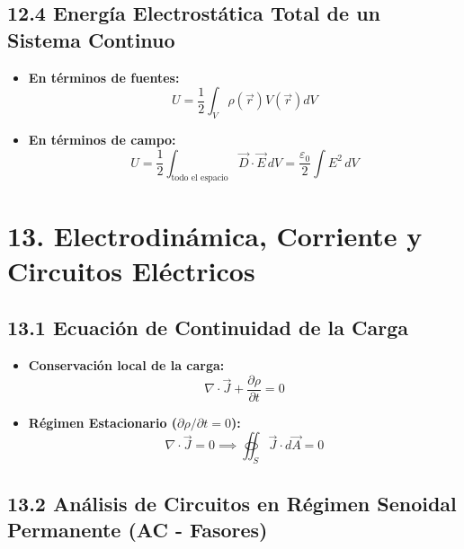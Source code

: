 \documentclass[11pt,a4paper]{article}
\begin{document}
\subsection*{12.4 Energía Electrostática Total de un Sistema Continuo}

\begin{itemize}
  \item \textbf{En términos de fuentes:}
  \[
    U = \frac{1}{2} \int_V \rho(\vec{r}) V(\vec{r}) dV
  \]
  \item \textbf{En términos de campo:}
  \[
    U = \frac{1}{2} \int_{\text{todo el espacio}} \vec{D} \cdot \vec{E} \, dV = \frac{\varepsilon_0}{2} \int E^2 \, dV
  \]
\end{itemize}

\section*{13. Electrodinámica, Corriente y Circuitos Eléctricos}

\subsection*{13.1 Ecuación de Continuidad de la Carga}

\begin{itemize}
  \item \textbf{Conservación local de la carga:}
  \[
    \nabla \cdot \vec{J} + \frac{\partial \rho}{\partial t} = 0
  \]
  \item \textbf{Régimen Estacionario ($\partial\rho/\partial t = 0$):}
  \[
    \nabla \cdot \vec{J} = 0 \implies \oiint_S \vec{J} \cdot d\vec{A} = 0
  \]
\end{itemize}

\subsection*{13.2 Análisis de Circuitos en Régimen Senoidal Permanente (AC - Fasores)}
\end{document}
